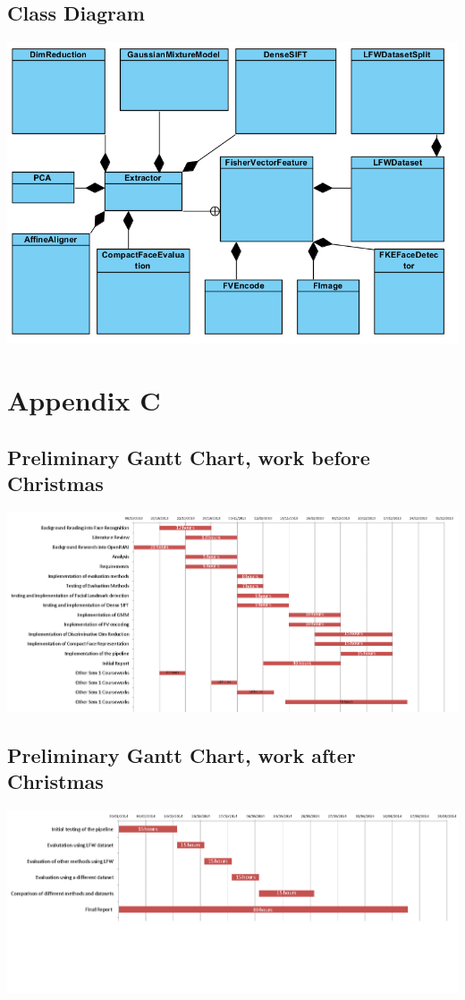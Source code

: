 \documentclass[12pt, a4paper]{article}
\begin{document}
\begin{appendices}
\subsection{Class Diagram}
\includegraphics[scale=0.6, angle=0]{images/class.png}

\section{Appendix C}
\subsection{Preliminary Gantt Chart, work before Christmas}
\includegraphics[scale=0.4, angle=90]{images/ganntFIRSTprexmas.png}
\subsection{Preliminary Gantt Chart, work after Christmas}
\includegraphics[scale=0.4, angle=90]{images/ganntFIRSTpostxmas.png}


\end{appendices}
\end{document}
